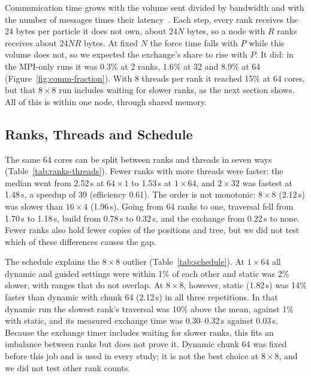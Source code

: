\documentclass[10pt,a4paper,twocolumn,twoside]{rho-class/rho}
\begin{document}
Communication time grows with the volume sent divided by bandwidth and with the number of messages times their latency~\cite{Lecture12}. Each step, every rank receives the 24 bytes per particle it does not own, about $24N$ bytes, so a node with $R$ ranks receives about $24NR$ bytes. At fixed $N$ the force time falls with $P$ while this volume does not, so we expected the exchange's share to rise with $P$. It did: in the MPI-only runs it was 0.3\% at 2 ranks, 1.6\% at 32 and 8.9\% at 64 (Figure~\ref{fig:comm-fraction}). With 8 threads per rank it reached 15\% at 64 cores, but that $8\times8$ run includes waiting for slower ranks, as the next section shows. All of this is within one node, through shared memory.

\subsection{Ranks, Threads and Schedule}
\label{sec:hybrid}
The same 64 cores can be split between ranks and threads in seven ways (Table~\ref{tab:ranks-threads}). Fewer ranks with more threads were faster: the median went from 2.52\,s at $64\times1$ to 1.53\,s at $1\times64$, and $2\times32$ was fastest at 1.48\,s, a speedup of 39 (efficiency 0.61). The order is not monotonic: $8\times8$ (2.12\,s) was slower than $16\times4$ (1.96\,s). Going from 64 ranks to one, traversal fell from 1.70\,s to 1.18\,s, build from 0.78\,s to 0.32\,s, and the exchange from 0.22\,s to none. Fewer ranks also hold fewer copies of the positions and tree, but we did not test which of these differences causes the gap.

The schedule explains the $8\times8$ outlier (Table~\ref{tab:schedule}). At $1\times64$ all dynamic and guided settings were within 1\% of each other and static was 2\% slower, with ranges that do not overlap. At $8\times8$, however, static (1.82\,s) was 14\% faster than dynamic with chunk 64 (2.12\,s) in all three repetitions. In that dynamic run the slowest rank's traversal was 10\% above the mean, against 1\% with static, and its measured exchange time was 0.30--0.32\,s against 0.03\,s. Because the exchange timer includes waiting for slower ranks, this fits an imbalance between ranks but does not prove it. Dynamic chunk 64 was fixed before this job and is used in every study; it is not the best choice at $8\times8$, and we did not test other rank counts.
\end{document}
